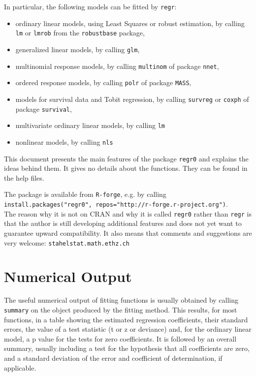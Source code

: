 \documentclass[11pt]{article}
\providecommand{\T}{\texttt}
\begin{document}
In particular, the following models can be fitted by \T{regr}:
\begin{itemize}
\item 
  ordinary linear models, using Least Squares or robust estimation,
  by calling \T{lm} or \T{lmrob} from the \T{robustbase} package,
\item
  generalized linear models, by calling \T{glm},
\item
  multinomial response models, by calling \T{multinom} of package
  \T{nnet},
\item
  ordered response models, by calling \T{polr} of package
  \T{MASS},
\item
  models for survival data and Tobit regression, by calling
  \T{survreg} or \T{coxph} of package \T{survival},
\item
  multivariate ordinary linear models, by calling \T{lm}
\item
  nonlinear models, by calling \T{nls}
\end{itemize}

This document presents the main features of the package \T{regr0}
and explains the ideas behind them. 
It gives no details about the functions. They can be found in
the help files.

The package is available from \T{R-forge}, e.g. by calling\\
\T{install.packages("regr0", repos="http://r-forge.r-project.org")}.\\
The reason why it is not on CRAN and why it is called \T{regr0} rather than 
\T{regr} is that the author is still developing additional features and
does not yet want to guarantee upward compatibility.
It also means that comments and suggestions are very welcome:
\T{stahel\@ stat.math.ethz.ch} %

\section{Numerical Output}
The useful numerical output of fitting functions is usually obtained by
calling \T{summary} on the object produced by the fitting method.
This results, for most functions, in a table showing the estimated
regression coefficients, their standard errors, the value of a test
statistic (t or z or deviance) and, for the 
ordinary linear model, a p value for the tests for zero coefficients. 
It is followed by an overall summary, usually including a test for
the hypothesis that all coefficients are zero, and a standard deviation of
the error and coefficient of determination, if applicable.
\end{document}
